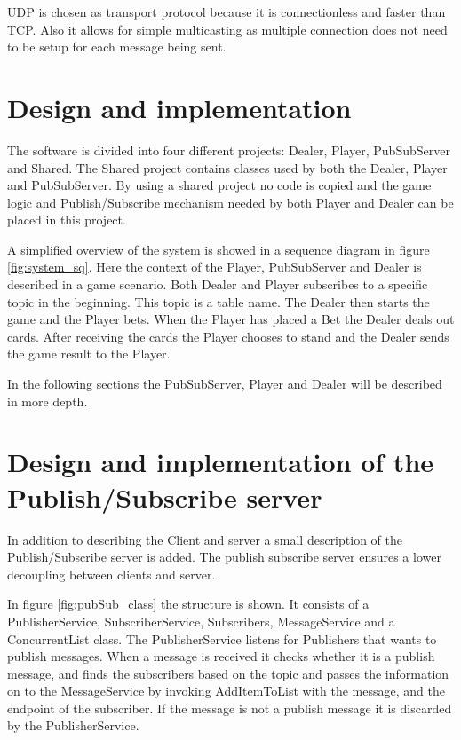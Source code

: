 
UDP is chosen as transport protocol because it is connectionless and faster than TCP. Also it allows for simple multicasting as multiple connection does not need to be setup for each message being sent.

\section{Design and implementation}
The software is divided into four different projects: Dealer, Player, PubSubServer and Shared. The Shared project contains classes used by both the Dealer, Player and PubSubServer. By using a shared project no code is copied and the game logic and Publish/Subscribe mechanism needed by both Player and Dealer can be placed in this project.

A simplified overview of the system is showed in a sequence diagram in figure \ref{fig:system_sq}. Here the context of the Player, PubSubServer and Dealer is described in a game scenario. Both Dealer and Player subscribes to a specific topic in the beginning. This topic is a table name. The Dealer then starts the game and the Player bets. When the Player has placed a Bet the Dealer deals out cards. After receiving the cards the Player chooses to stand and the Dealer sends the game result to the Player. 

\FloatBarrier

In the following sections the PubSubServer, Player and Dealer will be described in more depth.

\section{Design and implementation of the Publish/Subscribe server}
In addition to describing the Client and server a small description of the Publish/Subscribe server is added. The publish subscribe server ensures a lower decoupling between clients and server.


In figure \ref{fig:pubSub_class} the structure is shown. It consists of a PublisherService, SubscriberService, Subscribers, MessageService and a ConcurrentList class. The PublisherService listens for Publishers that wants to publish messages. When a message is received it checks whether it is a publish message, and finds the subscribers based on the topic and passes the information on to the MessageService by invoking AddItemToList with the message, and the endpoint of the subscriber. If the message is not a publish message it is discarded by the PublisherService.

